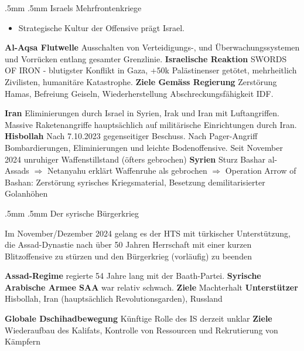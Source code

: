 {}\documentclass[a4paper,landscape,twoside]{article}
\makeatletter
\renewcommand{\section}{\@startsection{section}{1}{\z@}%
	{.5mm}%
	{.5mm}%
	{\normalfont\normalsize\bfseries}}
\makeatother
\begin{document}
\begin{multicols}{4}
	\section{Israels Mehrfrontenkriege}

	\begin{itemize}
		\item
		      Strategische Kultur der Offensive prägt Israel.
	\end{itemize}

	\textbf{Al-Aqsa Flutwelle}
	Ausschalten von Verteidigungs-, und Überwachungssystemen
	und Vorrücken entlang gesamter Grenzlinie.
	\textbf{Israelische Reaktion}
	SWORDS OF IRON - blutigster Konflikt in Gaza,
	+50k Palästinenser getötet,	mehrheitlich Zivilisten,
	humanitäre Katastrophe.
	\textbf{Ziele Gemäss Regierung}
	Zerstörung Hamas,
	Befreiung Geiseln,
	Wiederherstellung Abschreckungsfähigkeit IDF.

	\textbf{Iran}
	Eliminierungen durch Israel in Syrien, Irak und Iran mit Luftangriffen.
	Massive Raketenangriffe hauptsächlich auf militärische Einrichtungen durch Iran.
	\textbf{Hisbollah}
	Nach 7.10.2023 gegenseitiger Beschuss.
	Nach Pager-Angriff Bombardierungen, Eliminierungen und leichte Bodenoffensive.
	Seit November 2024 unruhiger Waffenstillstand (öfters gebrochen)
	\textbf{Syrien}
	Sturz Bashar al-Assads
	$\Rightarrow$
	Netanyahu erklärt Waffenruhe als gebrochen
	$\Rightarrow$
	Operation Arrow of Bashan:
	Zerstörung syrisches Kriegsmaterial,
	Besetzung demilitarisierter Golanhöhen



	\section{Der syrische Bürgerkrieg}

	Im November/Dezember 2024 gelang es der HTS mit türkischer
	Unterstützung, die Assad-Dynastie nach über 50 Jahren Herrschaft mit
	einer kurzen Blitzoffensive zu stürzen und den Bürgerkrieg (vorläufig)
	zu beenden

	\textbf{Assad-Regime}
	regierte 54 Jahre lang mit der Baath-Partei.
	\textbf{Syrische Arabische Armee SAA} war relativ schwach.
	\textbf{Ziele}
	Machterhalt
	\textbf{Unterstützer}
	Hisbollah,
	Iran (hauptsächlich Revolutionsgarden),
	Russland

	\textbf{Globale Dschihadbewegung}
	Künftige Rolle des IS derzeit unklar
	\textbf{Ziele}
	Wiederaufbau des Kalifats,
	Kontrolle von Ressourcen und Rekrutierung von Kämpfern


\end{multicols}
\end{document}
